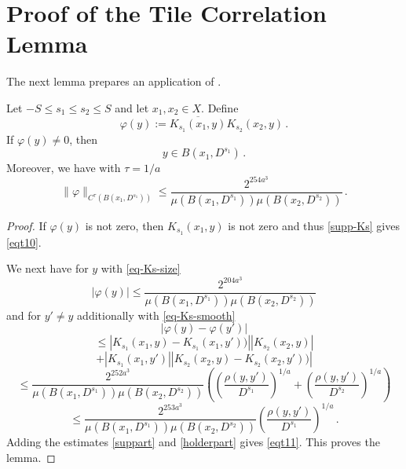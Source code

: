 \section{Proof of the Tile Correlation Lemma}\label{sec-tile-operator}

The next lemma prepares an application of
.
\begin{lemma}\label{correlation-kernel-bound}
Let $-S\le s_1\le s_2\le S$ and let $x_1,x_2\in X$.
Define \begin{equation}
 \varphi(y) := \overline{K_{s_1}(x_1, y)}
 K_{s_2}(x_2, y) \, .
\end{equation}
If $\varphi(y)\neq 0$, then
\begin{equation}\label{eqt10}
    y\in B(x_1, D^{s_1})\, .
\end{equation}
Moreover, we have with $\tau = 1/a$
\begin{equation}\label{eqt11}
  \|\varphi\|_{C^\tau(B(x_1, D^{s_1}))}\le
\frac{2^{254 a^3}}{\mu(B(x_1, D^{s_1}))\mu(B(x_2, D^{s_2}))}
      \, .
\end{equation}

\end{lemma}
\begin{proof}

If $\varphi(y)$ is not zero, then $K_{s_1}(x_1, y)$ is not zero and thus
\eqref{supp-Ks} gives \eqref{eqt10}.

We next have for $y$ with \eqref{eq-Ks-size}
\begin{equation}\label{suppart}
    |\varphi(y)|\le
    \frac{2^{204 a^3}}{\mu(B(x_1, D^{s_1}))\mu(B(x_2, D^{s_2}))}
\end{equation}
and for $y'\neq y$ additionally with \eqref{eq-Ks-smooth}
\begin{equation}
    |\varphi(y)-\varphi(y')|
 \end{equation}
 \begin{equation}
 \le
 |K_{s_1}(x_1,y)-K_{s_1}(x_1,y'))||
 K_{s_2}(x_2, y)|
\end{equation}
 \begin{equation}+|K_{s_1}(x_1, y')|
 |K_{s_2}(x_2, y) - K_{s_2}(x_2, y'))|
\end{equation}
\begin{equation}
      \le \frac{2^{252 a^3}}{\mu(B(x_1, D^{s_1}))\mu(B(x_2, D^{s_2}))}
       \left(\left(\frac{ \rho(y,y')}{D^{s_1}}\right)^{1/a}+
       \left(\frac{ \rho(y,y')}{D^{s_2}}\right)^{1/a}\right)
\end{equation}
\begin{equation}\label{holderpart}
      \le \frac{2^{253 a^3}}{\mu(B(x_1, D^{s_1}))\mu(B(x_2, D^{s_2}))}
       \left(\frac{ \rho(y,y')}{D^{s_1}}\right)^{1/a}\,.
\end{equation}
Adding the estimates \eqref{suppart} and \eqref{holderpart} gives \eqref{eqt11}.
This proves the lemma.
\end{proof}

